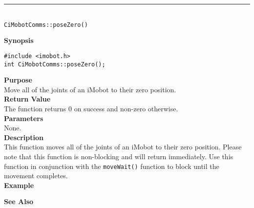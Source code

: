 \noindent
\vspace{5pt}
\rule{4.5in}{0.015in}\\
\noindent
{\LARGE \texttt{CiMobotComms::poseZero()}}\\
{}

\noindent
{\bf Synopsis}\\
\begin{verbatim}
#include <imobot.h>
int CiMobotComms::poseZero();
\end{verbatim}

\noindent
{\bf Purpose}\\
Move all of the joints of an iMobot to their zero position.\\

\noindent
{\bf Return Value}\\
The function returns 0 on success and non-zero otherwise.\\

\noindent
{\bf Parameters}\\
None.\\

\noindent
{\bf Description}\\
This function moves all of the joints of an iMobot to their zero position.
Please note that this function is non-blocking and will return immediately. Use
this function in conjunction with the \texttt{moveWait()} function to block
until the movement completes.\\

\noindent
{\bf Example}\\
\noindent

\noindent
{\bf See Also}\\

